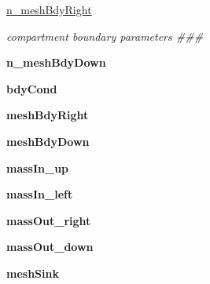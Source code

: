 \begin{DoxyCompactItemize}
\item 
\hyperlink{classcomp_1_1Comp_a3a618fb7afb0d89e902b18620f194cbb}{n\+\_\+mesh\+Bdy\+Right}\hypertarget{classcomp_1_1Comp_a3a618fb7afb0d89e902b18620f194cbb}{}\label{classcomp_1_1Comp_a3a618fb7afb0d89e902b18620f194cbb}

\begin{DoxyCompactList}\small\item\em compartment boundary parameters \#\#\# \end{DoxyCompactList}\item 
{\bfseries n\+\_\+mesh\+Bdy\+Down}\hypertarget{classcomp_1_1Comp_a9252858541b296d523e5a44d68f9cedf}{}\label{classcomp_1_1Comp_a9252858541b296d523e5a44d68f9cedf}

\item 
{\bfseries bdy\+Cond}\hypertarget{classcomp_1_1Comp_a823a5dec18a94793a7bcf36146f09d3c}{}\label{classcomp_1_1Comp_a823a5dec18a94793a7bcf36146f09d3c}

\item 
{\bfseries mesh\+Bdy\+Right}\hypertarget{classcomp_1_1Comp_aab5f766e5680035613a8f6b2a5408ef7}{}\label{classcomp_1_1Comp_aab5f766e5680035613a8f6b2a5408ef7}

\item 
{\bfseries mesh\+Bdy\+Down}\hypertarget{classcomp_1_1Comp_af5c9999c82110bffe604c7f788c0e6d8}{}\label{classcomp_1_1Comp_af5c9999c82110bffe604c7f788c0e6d8}

\item 
{\bfseries mass\+In\+\_\+up}\hypertarget{classcomp_1_1Comp_a85fc4415f3e5515b4bb7a1af3f84c855}{}\label{classcomp_1_1Comp_a85fc4415f3e5515b4bb7a1af3f84c855}

\item 
{\bfseries mass\+In\+\_\+left}\hypertarget{classcomp_1_1Comp_a665b8775b8f6f1aac3b09b3de2e9e581}{}\label{classcomp_1_1Comp_a665b8775b8f6f1aac3b09b3de2e9e581}

\item 
{\bfseries mass\+Out\+\_\+right}\hypertarget{classcomp_1_1Comp_ac238bc0ae06b22177f0dbb5a91b64383}{}\label{classcomp_1_1Comp_ac238bc0ae06b22177f0dbb5a91b64383}

\item 
{\bfseries mass\+Out\+\_\+down}\hypertarget{classcomp_1_1Comp_a172c670a337fbebe17b368c8a9d3982b}{}\label{classcomp_1_1Comp_a172c670a337fbebe17b368c8a9d3982b}

\item 
{\bfseries mesh\+Sink}\hypertarget{classcomp_1_1Comp_a33d823aa69b18368d38c187c0757e2d7}{}\label{classcomp_1_1Comp_a33d823aa69b18368d38c187c0757e2d7}


\end{DoxyCompactItemize}

